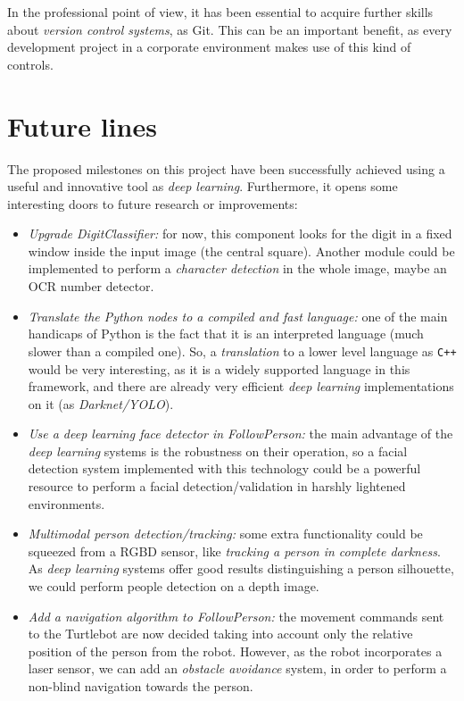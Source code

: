 	In the professional point of view, it has been essential to acquire further skills about \emph{version control systems}, as Git. This can be an important benefit, as every development project in a corporate environment makes use of this kind of controls.

\section{Future lines}
	The proposed milestones on this project have been successfully achieved using a useful and innovative tool as \emph{deep learning}. Furthermore, it opens some interesting doors to future research or improvements:
	
	\begin{itemize}
		\item \emph{Upgrade DigitClassifier:} for now, this component looks for the digit in a fixed window inside the input image (the central square). Another module could be implemented to perform a \emph{character detection} in the whole image, maybe an OCR number detector.
		
		\item \emph{Translate the Python nodes to a compiled and fast language:} one of the main handicaps of Python is the fact that it is an interpreted language (much slower than a compiled one). So, a \emph{translation} to a lower level language as \texttt{C++} would be very interesting, as it is a widely supported language in this framework, and there are already very efficient \emph{deep learning} implementations on it (as \emph{Darknet/YOLO}).
		
		\item \emph{Use a deep learning face detector in FollowPerson:} the main advantage of the \emph{deep learning} systems is the robustness on their operation, so a facial detection system implemented with this technology could be a powerful resource to perform a facial detection/validation in harshly lightened environments.
		
		\item \emph{Multimodal person detection/tracking:} some extra functionality could be squeezed from a RGBD sensor, like \emph{tracking a person in complete darkness}. As \emph{deep learning} systems offer good results distinguishing a person silhouette, we could perform people detection on a depth image.
		
		
		\item \emph{Add a navigation algorithm to FollowPerson:} the movement commands sent to the Turtlebot are now decided taking into account only the relative position of the person from the robot. However, as the robot incorporates a laser sensor, we can add an \emph{obstacle avoidance} system, in order to perform a non-blind navigation towards the person.
	\end{itemize}
